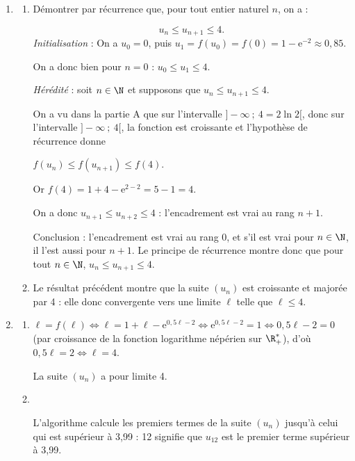 \begin{enumerate}
\item 
	\begin{enumerate}
		\item Démontrer par récurrence que, pour tout entier naturel $n$, on a : 

		\[u_n \leqslant u_{n+1} \leqslant 4.\]
\emph{Initialisation } : On a $u_0 = 0$, puis $u_1 = f\left(u_0\right) = f(0) = 1 - \text{e}^{-2} \approx 0,85$.

On a donc bien pour $n= 0$ : $u_0 \leqslant u_1 \leqslant 4$.

\emph{Hérédité} : soit $n \in \N$ et supposons que $u_n \leqslant u_{n+1} \leqslant 4$.

On a vu dans la partie A que sur l'intervalle $]- \infty~;~4 = 2\ln 2[$, donc sur l'intervalle $]- \infty~;~4[$, la fonction est croissante et l'hypothèse de récurrence donne

$f\left(u_n \right) \leqslant f\left(u_{n+1} \right) \leqslant f(4)$.

Or $f(4) = 1 + 4 - \text{e}^{2 - 2} = 5 -1 = 4$.

On a donc $u_{n+1} \leqslant u_{n+2} \leqslant 4$ : l'encadrement est vrai au rang $n + 1$.

Conclusion : l'encadrement est vrai au rang 0, et s'il est vrai pour $n \in \N$, il l'est aussi pour $n + 1$.
Le principe de récurrence montre donc que pour tout $n \in \N$, \: $u_n \leqslant u_{n+1} \leqslant 4$.
		
		\item 

Le résultat précédent montre que la suite $\left(u_n\right)$ est croissante et majorée par 4 : elle donc convergente vers une limite $\ell$ telle que $\ell \leqslant 4$.
	\end{enumerate}	
\item 
	\begin{enumerate}
		\item 
		

$\ell = f(\ell) \iff \ell = 1 + \ell - \text{e}^{0,5\ell - 2} \iff \text{e}^{0,5\ell - 2} = 1 \iff 0,5\ell - 2 = 0$ (par croissance de la fonction logarithme népérien sur $\R_{+}^*$), d'où $0,5\ell = 2 \iff \ell = 4$.

La suite $\left(u_n\right)$ a pour limite 4.
		\item ~
		

















L'algorithme calcule les premiers termes de la suite $\left(u_n\right)$ jusqu'à celui qui est supérieur à 3,99 : 12 signifie que $u_{12}$ est le premier terme supérieur à 3,99.
	\end{enumerate}
\end{enumerate}

\bigskip
